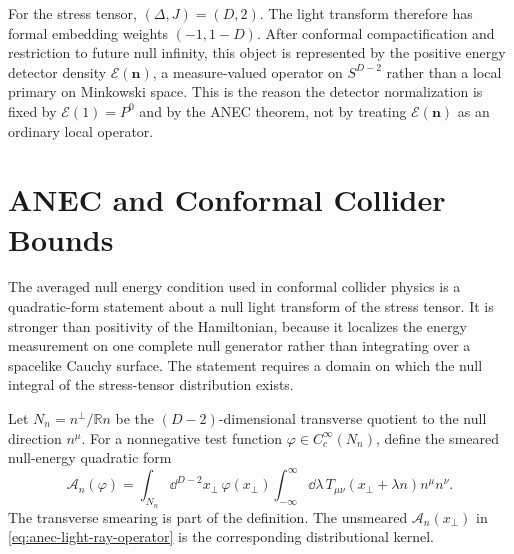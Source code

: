 For the stress tensor, \((\Delta,J)=(D,2)\).  The light transform therefore
has formal embedding weights \((-1,1-D)\).  After conformal compactification
and restriction to future null infinity, this object is represented by the
positive energy detector density \(\mathcal E(\mathbf n)\), a measure-valued
operator on \(S^{D-2}\) rather than a local primary on Minkowski space.  This
is the reason the detector normalization is fixed by
\(\mathcal E(1)=P^0\) and by the ANEC theorem, not by treating
\(\mathcal E(\mathbf n)\) as an ordinary local operator.

\section{ANEC and Conformal Collider Bounds}
\label{sec:anec-conformal-collider-bounds}

The averaged null energy condition used in conformal collider physics is a
quadratic-form statement about a null light transform of the stress tensor.
It is stronger than positivity of the Hamiltonian, because it localizes the
energy measurement on one complete null generator rather than integrating
over a spacelike Cauchy surface.  The statement requires a domain on which the
null integral of the stress-tensor distribution exists.

Let \(N_n=n^\perp/\mathbb R n\) be the \((D-2)\)-dimensional transverse
quotient to the null direction \(n^\mu\).  For a nonnegative test function
\(\varphi\in C_c^\infty(N_n)\), define the smeared null-energy quadratic form
\begin{equation}
  \mathcal A_n(\varphi)
  =
  \int_{N_n}\dd^{D-2}x_\perp\,\varphi(x_\perp)
  \int_{-\infty}^{\infty}\dd\lambda\,
  T_{\mu\nu}(x_\perp+\lambda n)n^\mu n^\nu .
  \label{eq:anec-smeared-transverse}
\end{equation}
The transverse smearing is part of the definition.  The unsmeared
\(\mathcal A_n(x_\perp)\) in \eqref{eq:anec-light-ray-operator} is the
corresponding distributional kernel.

